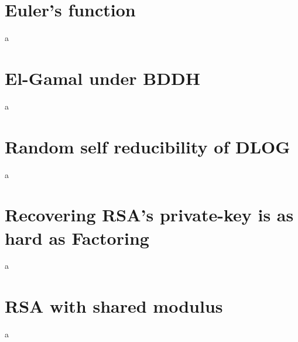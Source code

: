 \documentclass{article}
\begin{document}
\section{Euler's function}
\begin{paragraph}
	a
\end{paragraph}

\section{El-Gamal under BDDH}
\begin{paragraph}
	a 
\end{paragraph}

\section{Random self reducibility of DLOG}
\begin{paragraph}
	a 
\end{paragraph}

\section{Recovering RSA's private-key is as hard as Factoring}
\begin{paragraph}
	a 
\end{paragraph}

\section{RSA with shared modulus}
\begin{paragraph}
	a 
\end{paragraph}
\end{document}
